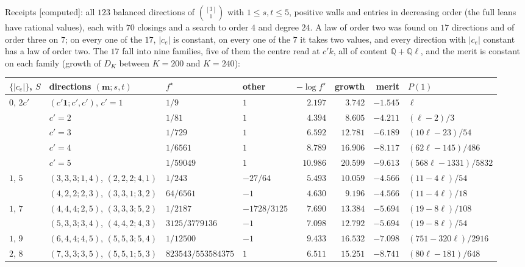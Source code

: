 \documentclass[11pt]{article}
\newcommand{\one}{\mathbf 1}
\newcommand{\mvec}{\mathbf m}
\theoremstyle{plain}
\theoremstyle{definition}
\theoremstyle{remark}
\newcommand{\computed}{\textup{[computed]}}
\begin{document}
\noindent Receipts \computed: all $123$ balanced directions of $\binom{[3]}1$ with $1\le s,t\le5$, positive walls and entries in decreasing order (the full leans have rational values), each with $70$ closings and a search to order $4$ and degree $24$. A law of order two was found on $17$ directions and of order three on $7$; on every one of the $17$, $|c_e|$ is constant, on every one of the $7$ it takes two values, and every direction with $|c_e|$ constant has a law of order two. The $17$ fall into nine families, five of them the centre read at $c'k$, all of content $\mathbb Q+\mathbb Q\ell$, and the merit is constant on each family (growth of $D_K$ between $K=200$ and $K=240$):
\begin{center}
\footnotesize
\setlength{\tabcolsep}{4pt}
\begin{tabular}{@{}l l l l r r r l@{}}
\toprule
$\{|c_e|\}$, $S$ & directions $(\mvec;s,t)$ & $f^\star$ & other & $-\log f^\star$ & growth & merit & $P(1)$\\ \midrule
$0$, $2c'$ & $(c'\one;c',c')$, $c'=1$ & $1/9$ & $1$ & $2.197$ & $3.742$ & $-1.545$ & $\ell$\\
 & \qquad $c'=2$ & $1/81$ & $1$ & $4.394$ & $8.605$ & $-4.211$ & $(\ell-2)/3$\\
 & \qquad $c'=3$ & $1/729$ & $1$ & $6.592$ & $12.781$ & $-6.189$ & $(10\ell-23)/54$\\
 & \qquad $c'=4$ & $1/6561$ & $1$ & $8.789$ & $16.906$ & $-8.117$ & $(62\ell-145)/486$\\
 & \qquad $c'=5$ & $1/59049$ & $1$ & $10.986$ & $20.599$ & $-9.613$ & $(568\ell-1331)/5832$\\[2pt]
$1$, $5$ & $(3,3,3;1,4)$, $(2,2,2;4,1)$ & $1/243$ & $-27/64$ & $5.493$ & $10.059$ & $-4.566$ & $(11-4\ell)/54$\\
 & $(4,2,2;2,3)$, $(3,3,1;3,2)$ & $64/6561$ & $-1$ & $4.630$ & $9.196$ & $-4.566$ & $(11-4\ell)/18$\\[2pt]
$1$, $7$ & $(4,4,4;2,5)$, $(3,3,3;5,2)$ & $1/2187$ & $-1728/3125$ & $7.690$ & $13.384$ & $-5.694$ & $(19-8\ell)/108$\\
 & $(5,3,3;3,4)$, $(4,4,2;4,3)$ & $3125/3779136$ & $-1$ & $7.098$ & $12.792$ & $-5.694$ & $(19-8\ell)/54$\\[2pt]
$1$, $9$ & $(6,4,4;4,5)$, $(5,5,3;5,4)$ & $1/12500$ & $-1$ & $9.433$ & $16.532$ & $-7.098$ & $(751-320\ell)/2916$\\[2pt]
$2$, $8$ & $(7,3,3;3,5)$, $(5,5,1;5,3)$ & $823543/553584375$ & $1$ & $6.511$ & $15.251$ & $-8.741$ & $(80\ell-181)/648$\\
\bottomrule
\end{tabular}
\end{center}
\end{document}
